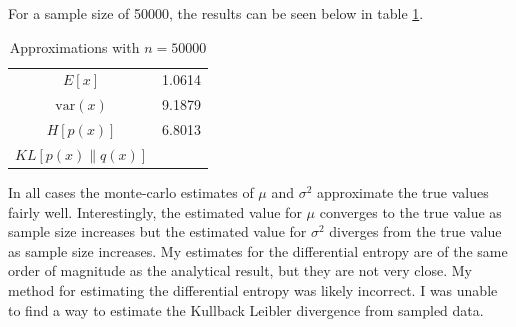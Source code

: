 \documentclass[11pt]{article}
\begin{document}
For a sample size of 50000, the results can be seen below in table \ref{tab:table4}.
\begin{table}[h!]
  \begin{center}
    \caption{Approximations with $n=50000$}
    \label{tab:table4}
    \begin{tabular}{c|c}
      $E[x]$ & 1.0614 \\
      $\text{var}(x)$ & 9.1879 \\
      $H[p(x)]$ & 6.8013 \\
      $KL[p(x)\|q(x)]$ &  \\
    \end{tabular}
  \end{center}
\end{table}

In all cases the monte-carlo estimates of $\mu$ and $\sigma^2$ approximate the true values fairly well. Interestingly, the estimated value for $\mu$ converges to the true value as sample size increases but the estimated value for $\sigma^2$ diverges from the true value as sample size increases. My estimates for the differential entropy are of the same order of magnitude as the analytical result, but they are not very close. My method for estimating the differential entropy was likely incorrect. I was unable to find a way to estimate the Kullback Leibler divergence from sampled data.
\end{document}
